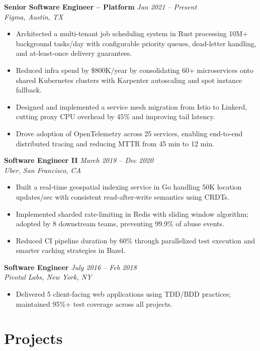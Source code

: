 \documentclass[11pt,a4paper]{article}
\begin{document}
\noindent\textbf{Senior Software Engineer -- Platform} \hfill \textit{Jan 2021 -- Present}\\
\textit{Figma, Austin, TX}
\begin{itemize}
  \item Architected a multi-tenant job scheduling system in Rust processing 10M+ background tasks/day with configurable priority queues, dead-letter handling, and at-least-once delivery guarantees.
  \item Reduced infra spend by \$800K/year by consolidating 60+ microservices onto shared Kubernetes clusters with Karpenter autoscaling and spot instance fallback.
  \item Designed and implemented a service mesh migration from Istio to Linkerd, cutting proxy CPU overhead by 45\% and improving tail latency.
  \item Drove adoption of OpenTelemetry across 25 services, enabling end-to-end distributed tracing and reducing MTTR from 45 min to 12 min.
\end{itemize}

\vspace{4pt}
\noindent\textbf{Software Engineer II} \hfill \textit{March 2018 -- Dec 2020}\\
\textit{Uber, San Francisco, CA}
\begin{itemize}
  \item Built a real-time geospatial indexing service in Go handling 50K location updates/sec with consistent read-after-write semantics using CRDTs.
  \item Implemented sharded rate-limiting in Redis with sliding window algorithm; adopted by 8 downstream teams, preventing 99.9\% of abuse events.
  \item Reduced CI pipeline duration by 60\% through parallelized test execution and smarter caching strategies in Bazel.
\end{itemize}

\vspace{4pt}
\noindent\textbf{Software Engineer} \hfill \textit{July 2016 -- Feb 2018}\\
\textit{Pivotal Labs, New York, NY}
\begin{itemize}
  \item Delivered 5 client-facing web applications using TDD/BDD practices; maintained 95\%+ test coverage across all projects.
\end{itemize}

\section{Projects}
\end{document}

